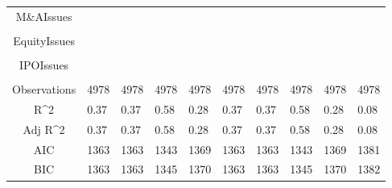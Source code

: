 \documentclass{article}
\begin{document}
\begin{table}[H]
\begin{tabular}{|clllllllll|}
  M\&AIssues &  &  &  &  &  &  &  &  &  \\ 
   &  &  &  &  &  &  &  &  &  \\ 
  EquityIssues &  &  &  &  &  &  &  &  &  \\ 
   &  &  &  &  &  &  &  &  &  \\ 
  IPOIssues &  &  &  &  &  &  &  &  &  \\ 
   &  &  &  &  &  &  &  &  &  \\ 
  \hline 
 Observations & 4978 & 4978 & 4978 & 4978 & 4978 & 4978 & 4978 & 4978 & 4978 \\ 
  R^2 & 0.37 & 0.37 & 0.58 & 0.28 & 0.37 & 0.37 & 0.58 & 0.28 & 0.08 \\ 
  Adj R^2 & 0.37 & 0.37 & 0.58 & 0.28 & 0.37 & 0.37 & 0.58 & 0.28 & 0.08 \\ 
  AIC & 1363 & 1363 & 1343 & 1369 & 1363 & 1363 & 1343 & 1369 & 1381 \\ 
  BIC & 1363 & 1363 & 1345 & 1370 & 1363 & 1363 & 1345 & 1370 & 1382 \\ 
   \hline
\end{tabular}
 
\end{table}
\end{document}
